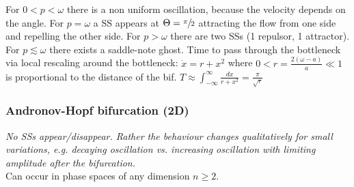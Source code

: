 For $0<p<\omega$ there is a non uniform oscillation, because the velocity depends on the angle. For $p=\omega$ a SS appears at $\Theta=\sfrac{\pi}{2}$ attracting the flow from one side and repelling the other side. For $p>\omega$ there are two SSs (1 repulsor, 1 attractor).\\
For $p\lesssim\omega$ there exists a saddle-note ghost. Time to pass through the bottleneck via local rescaling around the bottleneck: $\dot{x}=r+x^2$ where $0<r = \frac{2(\omega-a)}{a}\ll 1$ is proportional to the distance of the bif. $T\approx
\int_{-\infty}^{\infty} \frac{dx}{r+x^2} = \frac{\pi}{\sqrt{r}}$

\begin{center}
\end{center}

\subsubsection{Andronov-Hopf bifurcation (2D)}
\emph{No SSs appear/disappear. Rather the behaviour changes qualitatively for small variations, e.g. decaying oscillation vs. increasing oscillation with limiting amplitude after the bifurcation.}\\
Can occur in phase spaces of any dimension $n\geq 2$.

